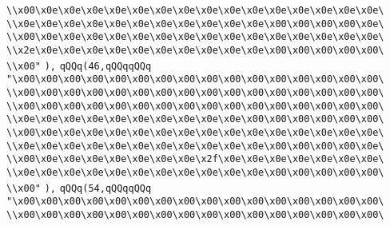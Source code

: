 \verb|\\x00\x0e\x0e\x0e\x0e\x0e\x0e\x0e\x0e\x0e\x0e\x0e\x0e\x0e\x0e\x0e\|\newline
\verb|\\x0e\x0e\x0e\x0e\x0e\x0e\x0e\x0e\x0e\x0e\x0e\x00\x00\x00\x00\x0e\|\newline
\verb|\\x00\x0e\x0e\x0e\x0e\x0e\x0e\x0e\x0e\x0e\x0e\x0e\x0e\x0e\x0e\x0e\|\newline
\verb|\\x2e\x0e\x0e\x0e\x0e\x0e\x0e\x0e\x0e\x0e\x0e\x00\x00\x00\x00\x00\|\newline
\verb|\\x00"|\newline
\verb|),|\newline
\verb|qQQq(46,qQQqqQQq|\newline
\verb|"\x00\x00\x00\x00\x00\x00\x00\x00\x00\x00\x00\x00\x00\x00\x00\x00\|\newline
\verb|\\x00\x00\x00\x00\x00\x00\x00\x00\x00\x00\x00\x00\x00\x00\x00\x00\|\newline
\verb|\\x00\x00\x00\x00\x00\x00\x00\x00\x00\x00\x00\x00\x00\x00\x00\x00\|\newline
\verb|\\x0e\x0e\x0e\x0e\x0e\x0e\x0e\x0e\x0e\x0e\x00\x00\x00\x00\x00\x00\|\newline
\verb|\\x00\x0e\x0e\x0e\x0e\x0e\x0e\x0e\x0e\x0e\x0e\x0e\x0e\x0e\x0e\x0e\|\newline
\verb|\\x0e\x0e\x0e\x0e\x0e\x0e\x0e\x0e\x0e\x0e\x0e\x00\x00\x00\x00\x0e\|\newline
\verb|\\x00\x0e\x0e\x0e\x0e\x0e\x0e\x0e\x2f\x0e\x0e\x0e\x0e\x0e\x0e\x0e\|\newline
\verb|\\x0e\x0e\x0e\x0e\x0e\x0e\x0e\x0e\x0e\x0e\x0e\x00\x00\x00\x00\x00\|\newline
\verb|\\x00"|\newline
\verb|),|\newline
\verb|qQQq(54,qQQqqQQq|\newline
\verb|"\x00\x00\x00\x00\x00\x00\x00\x00\x00\x00\x00\x00\x00\x00\x00\x00\|\newline
\verb|\\x00\x00\x00\x00\x00\x00\x00\x00\x00\x00\x00\x00\x00\x00\x00\x00\|\newline
